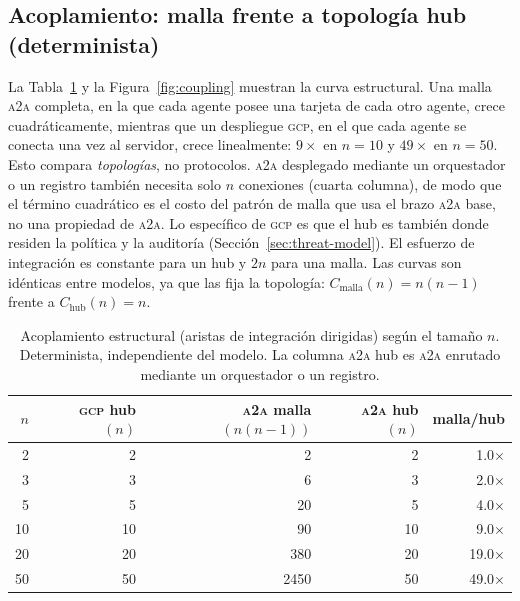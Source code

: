 \documentclass[conference,letterpaper]{IEEEtran}
\newcommand{\gcp}{\textsc{gcp}}
\newcommand{\ata}{\textsc{a2a}}
\begin{document}
\subsection{Acoplamiento: malla frente a topología hub (determinista)}
La Tabla~\ref{tab:struct} y la Figura~\ref{fig:coupling} muestran la curva estructural. Una malla
\ata{} completa, en la que cada agente posee una tarjeta de cada otro agente, crece cuadráticamente,
mientras que un despliegue \gcp{}, en el que cada agente se conecta una vez al servidor, crece
linealmente: $9\times$ en $n{=}10$ y $49\times$ en $n{=}50$. Esto compara \emph{topologías}, no
protocolos. \ata{} desplegado mediante un orquestador o un registro también necesita solo $n$ conexiones
(cuarta columna), de modo que el término cuadrático es el costo del patrón de malla que usa el brazo
\ata{} base, no una propiedad de \ata{}. Lo específico de \gcp{} es que el hub es también donde residen
la política y la auditoría (Sección~\ref{sec:threat-model}). El esfuerzo de integración es constante para
un hub y $2n$ para una malla. Las curvas son idénticas entre modelos, ya que las fija la topología:
$C_{\text{malla}}(n)=n(n{-}1)$ frente a $C_{\text{hub}}(n)=n$.

\begin{table}[H]
\centering
\caption{Acoplamiento estructural (aristas de integración dirigidas) según el tamaño $n$. Determinista,
independiente del modelo. La columna \ata{} hub es \ata{} enrutado mediante un orquestador o un registro.}
\label{tab:struct}
\begin{tabular}{rrrrr}
\toprule
$n$ & \gcp{} hub $(n)$ & \ata{} malla $(n(n{-}1))$ & \ata{} hub $(n)$ & malla/hub \\
\midrule
2  & 2  & 2    & 2  & 1.0$\times$ \\
3  & 3  & 6    & 3  & 2.0$\times$ \\
5  & 5  & 20   & 5  & 4.0$\times$ \\
10 & 10 & 90   & 10 & 9.0$\times$ \\
20 & 20 & 380  & 20 & 19.0$\times$ \\
50 & 50 & 2450 & 50 & 49.0$\times$ \\
\bottomrule
\end{tabular}
\end{table}
\end{document}
